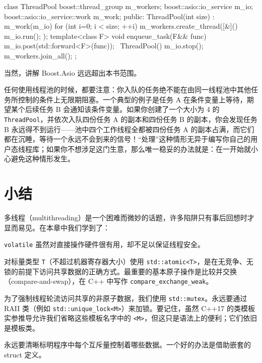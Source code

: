 \begin{codebox}[cpp]
    class ThreadPool {
      boost::thread_group m_workers;
      boost::asio::io_service m_io;
      boost::asio::io_service::work m_work;
    public:
      ThreadPool(int size) : m_work(m_io) {
        for (int i=0; i < size; ++i) {
          m_workers.create_thread([&](){ m_io.run(); });
        }
      }
      template<class F>
      void enqueue_task(F&& func) {
        m_io.post(std::forward<F>(func));
      }
      ~ThreadPool() {
        m_io.stop();
        m_workers.join_all();
      }
    };
\end{codebox}

当然，讲解 Boost.Asio 远远超出本书范围。

任何使用线程池的时候，都要注意：你入队的任务绝不能在由同一线程池中其他任务所控制的条件上无限期阻塞。一个典型的例子是任务 A 在条件变量上等待，期望某个后续任务 B 会通知该条件变量。如果你创建了一个大小为 4 的 \texttt{Thread\allowbreak{}Pool}，并依次入队四份任务 A 的副本和四份任务 B 的副本，你会发现任务 B 永远得不到运行——池中四个工作线程全都被四份任务 A 的副本占满，而它们都在沉睡，等待一个永远不会到来的信号！“处理”这种情形无异于编写你自己的用户态线程库；如果你不想涉足这门生意，那么唯一稳妥的办法就是：在一开始就小心避免这种情形发生。

\section{小结}

多线程（multithreading）是一个困难而微妙的话题，许多陷阱只有事后回想时才显而易见。在本章中我们学到了：

\texttt{volatile} 虽然对直接操作硬件很有用，却不足以保证线程安全。

对标量类型 \texttt{T}（不超过机器寄存器大小）使用 \texttt{std::\allowbreak{}atomic<\allowbreak{}T>\allowbreak{}}，是在无竞争、无锁的前提下访问共享数据的正确方式。最重要的基本原子操作是比较并交换（compare-and-swap），在 C++ 中写作 \texttt{compare\_\allowbreak{}exchange\_\allowbreak{}weak}。

为了强制线程轮流访问共享的非原子数据，我们使用 \texttt{std::\allowbreak{}mutex}。永远要通过 RAII 类（例如 \texttt{std::\allowbreak{}unique\_\allowbreak{}lock<\allowbreak{}M>\allowbreak{}}）来加锁。要记住，虽然 C++17 的类模板实参推导允许我们省略这些模板名字中的 \texttt{<M>\allowbreak{}}，但这只是语法上的便利；它们依旧是模板类。

永远要清晰标明程序中每个互斥量控制着哪些数据。一个好的办法是借助嵌套的 struct 定义。

